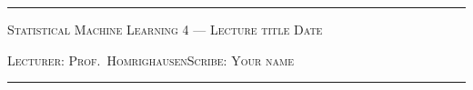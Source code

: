 \documentclass[10pt]{article}
\newcommand{\lecture}{Prof.\ Homrighausen}
\newcommand{\scribe}{Your name}
\newcommand{\chtitle}{Lecture title}
\newcommand{\lecdate}{Date}
\begin{document}
\rule{6.5in}{1pt}

\textsc{Statistical Machine Learning
  \hfill 4 --- \chtitle
  \hfill \lecdate}

\textsc{Lecturer: \lecture \hfill Scribe: \scribe}
\rule{6.5in}{1pt}



\end{document}
